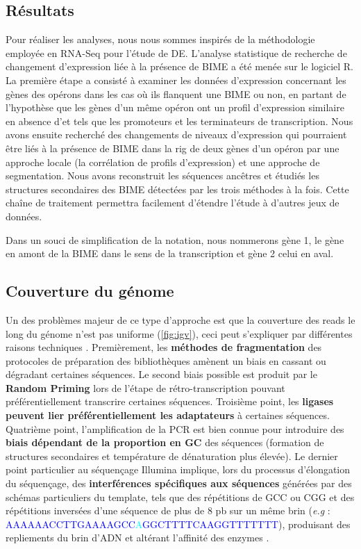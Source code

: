 \documentclass[12pt,a4paper]{report}
\begin{document}
\begin{onehalfspace}
\chapter*{Résultats}

Pour réaliser les analyses, nous nous sommes inspirés de la méthodologie employée en RNA-Seq pour l'étude de DE. L'analyse statistique de recherche de changement d'expression liée à la présence de BIME a été menée sur le logiciel R. La première étape a consisté à examiner les données d'expression concernant les gènes des opérons dans les cas où ils flanquent une BIME ou non, en partant de l'hypothèse que les gènes d'un même opéron ont un profil d'expression similaire en absence d'\gls{et} tels que les promoteurs et les terminateurs de transcription. Nous avons ensuite recherché des changements de niveaux d'expression qui pourraient être liés à la présence de BIME dans la \gls{rig} de deux gènes d'un opéron par une approche locale (la corrélation de profils d'expression) et une approche de segmentation. Nous avons reconstruit les séquences ancêtres et étudiés les structures secondaires des BIME détectées par les trois méthodes à la fois. Cette chaîne de traitement permettra facilement d'étendre l'étude à d'autres jeux de données.

Dans un souci de simplification de la notation, nous nommerons gène 1, le gène en amont de la BIME dans le sens de la transcription et gène 2 celui en aval.

\section*{Couverture du génome}
\label{uniformite_couverture}
Un des problèmes majeur de ce type d'approche est que la couverture des reads le long du génome n'est pas uniforme (\autoref{fig:igv}), ceci peut s'expliquer par différentes raisons techniques \citep{Li2013}. Premièrement, les \textbf{méthodes de fragmentation} des protocoles de préparation des bibliothèques amènent un biais en cassant ou dégradant certaines séquences. Le second biais possible est produit par le \textbf{Random Priming} lors de l'étape de rétro-transcription pouvant préférentiellement transcrire certaines séquences. Troisième point, les \textbf{ligases peuvent lier préférentiellement les adaptateurs} à certaines séquences. Quatrième point, l'amplification de la PCR est bien connue pour introduire des \textbf{biais dépendant de la proportion en GC} des séquences (formation de structures secondaires et température de dénaturation plus élevée). Le dernier point particulier au séquençage Illumina implique, lors du processus d'élongation du séquençage, des \textbf{interférences spécifiques aux séquences} générées par des schémas particuliers du template, tels que des répétitions de GCC ou CGG et des répétitions inversées d'une séquence de plus de 8 pb sur un même brin (\textit{e.g} : \textcolor{blue}{AAAAAACCTTGAAAAGCC}\textcolor{cyan}{A}\textcolor{blue}{GGCTTTTCAAGGTTTTTTT}), produisant des repliements du brin d'ADN et altérant l'affinité des enzymes \citep{Nakamura2011}. 


\end{onehalfspace}
\end{document}
